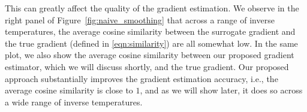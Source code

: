 This can greatly affect the quality of the gradient estimation. 
We observe in the right panel of Figure~\ref{fig:naive_smoothing} that across a range of inverse temperatures, the average cosine similarity between the surrogate gradient and the true gradient (defined in \eqref{eqn:similarity}) are all somewhat low.
In the same plot, we also show the average cosine similarity between our proposed gradient estimator, which we will discuss shortly, and the true gradient. Our proposed approach substantially improves the gradient estimation accuracy, i.e., the average cosine similarity is close to $1$, and as we will show later, it does so across a wide range of inverse temperatures. %

